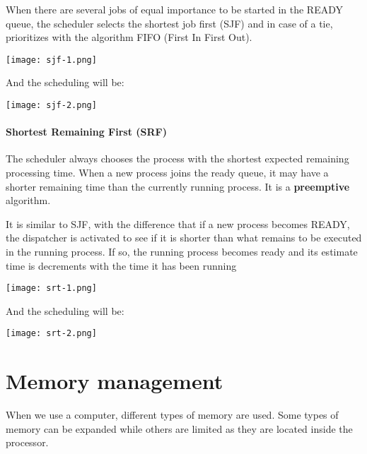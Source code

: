 When there are several jobs of equal importance to be started in the READY queue, the scheduler selects the shortest job first (SJF) and in case of a tie, prioritizes with the algorithm FIFO (First In First Out).

\begin{center}
    \texttt{[image: sjf-1.png]}
\end{center}

And the scheduling will be:

\begin{center}
    \texttt{[image: sjf-2.png]}
\end{center}


\subsubsection{Shortest Remaining First (SRF)}

The scheduler always chooses the process with the shortest expected remaining processing time. When a new process joins the ready queue, it may have a shorter remaining time than the currently running process.  It is a \textbf{preemptive} algorithm.

It is similar to SJF, with the difference that if a new process becomes READY, the dispatcher is activated to see if it is shorter than what remains to be executed in the running process. If so, the running process becomes ready and its estimate time is
decrements with the time it has been running

\begin{center}
    \texttt{[image: srt-1.png]}
\end{center}

And the scheduling will be:

\begin{center}
    \texttt{[image: srt-2.png]}
\end{center}



\hypertarget{memory_management}{}
\chapter{Memory management}

When we use a computer, different types of memory are used. Some types of memory can be expanded while others are limited as they are located inside the processor.

